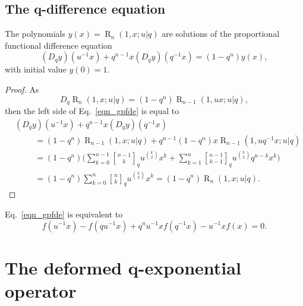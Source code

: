 \documentclass{cimart}
\newcommand{\qbinom}{\genfrac{[}{]}{0pt}{}}
\DeclareMathOperator{\opR}{R}
\begin{document}
\subsection{The q-difference equation}

\begin{theorem}
The polynomials $y(x)=\opR_{n}(1,x;u|q)$ are solutions of the proportional functional difference equation
\begin{equation}\label{eqn_gpfde}
    (D_{q}y)(u^{-1}x)+q^{n-1}x(D_{q}y)(q^{-1}x)=(1-q^n)y(x),
\end{equation}
with initial value $y(0)=1$. 
\end{theorem}
\begin{proof}
As
\begin{equation*}
    D_{q}\opR_{n}(1,x;u|q)=(1-q^n)\opR_{n-1}(1,ux;u|q),
\end{equation*}
then the left side of Eq.~\eqref{eqn_gpfde} is equal to
\begin{align*}
    &(D_{q}y)(u^{-1}x)+q^{n-1}x(D_{q}y)(q^{-1}x)\\
    &\hspace{1cm}=(1-q^n)\opR_{n-1}(1,x;u|q)+q^{n-1}(1-q^n)x\opR_{n-1}(1,uq^{-1}x;u|q)\\
    &\hspace{1cm}=(1-q^n)\bigg(\sum_{k=0}^{n-1}\qbinom{n-1}{k}_{q}u^{\binom{k}{2}}x^k+\sum_{k=1}^{n}\qbinom{n-1}{k-1}_{q}u^{\binom{k}{2}}q^{n-k}x^{k}\bigg)\\
    &\hspace{1cm}=(1-q^n)\sum_{k=0}^{n}\qbinom{n}{k}_{q}u^{\binom{k}{2}}x^{k}=(1-q^n)\opR_{n}(1,x;u|q).
\end{align*}
\end{proof}
Eq.~\eqref{eqn_gpfde} is equivalent to
\begin{equation}
    f(u^{-1}x)-f(qu^{-1}x)+q^{n}u^{-1}xf(q^{-1}x)-u^{-1}xf(x)=0.
\end{equation}

\section{The deformed q-exponential operator}
\end{document}
